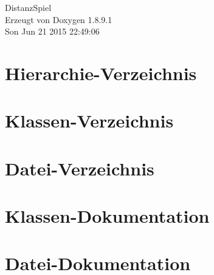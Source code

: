 \documentclass[twoside]{book}
\newcommand{\+}{\discretionary{\mbox{\scriptsize$\hookleftarrow$}}{}{}}
\newcommand{\clearemptydoublepage}{%
  \newpage{\pagestyle{empty}\cleardoublepage}%
}
\begin{document}
\hypersetup{pageanchor=false,
             bookmarks=true,
             bookmarksnumbered=true,
             pdfencoding=unicode
            }
\begin{titlepage}
\vspace*{7cm}
\begin{center}%
{\Large Distanz\+Spiel }\\
\vspace*{1cm}
{\large Erzeugt von Doxygen 1.8.9.1}\\
\vspace*{0.5cm}
{\small Son Jun 21 2015 22:49:06}\\
\end{center}
\end{titlepage}
\clearemptydoublepage
\tableofcontents
\clearemptydoublepage
{}
\hypersetup{pageanchor=true}

\chapter{Hierarchie-\/\+Verzeichnis}

\chapter{Klassen-\/\+Verzeichnis}

\chapter{Datei-\/\+Verzeichnis}

\chapter{Klassen-\/\+Dokumentation}















\chapter{Datei-\/\+Dokumentation}































\backmatter
\newpage
{}
\clearemptydoublepage
{}
\printindex
\end{document}
